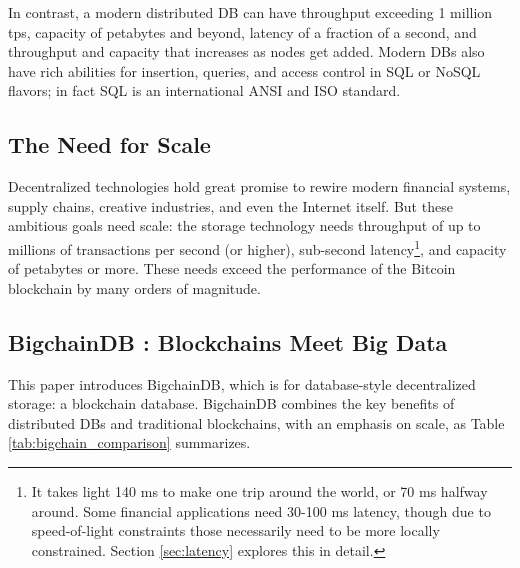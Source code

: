 In contrast, a modern distributed DB can have throughput exceeding 1 million tps, capacity of petabytes and beyond, latency of a fraction of a second, and throughput and capacity that increases as nodes get added.
Modern DBs also have rich abilities for insertion, queries, and access control in SQL or NoSQL flavors; in fact SQL is an international ANSI and ISO standard.

\subsection{The Need for Scale}
Decentralized technologies hold great promise to rewire modern financial systems, supply chains, creative industries, and even the Internet itself.
But these ambitious goals need scale: the storage technology needs throughput of up to millions of transactions per second (or higher), sub-second latency\footnote{It takes light 140 ms to make one trip around the world, or 70 ms halfway around. Some financial applications need 30-100 ms latency, though due to speed-of-light constraints those necessarily need to be more locally constrained. Section \ref{sec:latency} explores this in detail.}, and capacity of petabytes or more.
These needs exceed the performance of the Bitcoin blockchain by many orders of magnitude.

\subsection{BigchainDB : Blockchains Meet Big Data}
This paper introduces BigchainDB, which is for database-style decentralized storage: a blockchain database.
BigchainDB combines the key benefits of distributed DBs and traditional blockchains, with an emphasis on scale, as Table \ref{tab:bigchain_comparison} summarizes.

